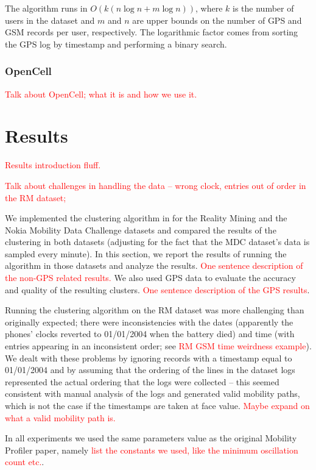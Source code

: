 \documentclass[letterpaper, 11pt, conference]{ieeeconf}
\newcommand{\xxx}[1]{\textcolor{red}{#1}}
\begin{document}
The algorithm runs in $O(k(n\log n + m\log n))$, where $k$ is the number of users in the dataset and $m$ and $n$ are upper bounds on the number of GPS and GSM records per user, respectively. The logarithmic factor comes from sorting the GPS log by timestamp and performing a binary search.

\subsubsection{OpenCell}

\xxx{Talk about OpenCell; what it is and how we use it.}

\section{Results}
\label{sec:results}
\xxx{Results introduction fluff.}

\xxx{Talk about challenges in handling the data -- wrong clock, entries out of order in the RM dataset;}

We implemented the clustering algorithm in \cite{mobilityprofiler} for the Reality Mining and the Nokia Mobility Data Challenge datasets and compared the results of the clustering in both datasets (adjusting for the fact that the MDC dataset's data is sampled every minute). In this section, we report the results of running the algorithm in those datasets and analyze the results. \xxx{One sentence description of the non-GPS related results.} We also used GPS data to evaluate the accuracy and quality of the resulting clusters. \xxx{One sentence description of the GPS results}.

Running the clustering algorithm on the RM dataset was more challenging than originally expected; there were inconsistencies with the dates (apparently the phones' clocks reverted to 01/01/2004 when the battery died) and time (with entries appearing in an inconsistent order; see \xxx{RM GSM time weirdness example}). We dealt with these problems by ignoring records with a timestamp equal to 01/01/2004 and by assuming that the ordering of the lines in the dataset logs represented the actual ordering that the logs were collected -- this seemed consistent with manual analysis of the logs and generated valid mobility paths, which is not the case if the timestamps are taken at face value. \xxx{Maybe expand on what a valid mobility path is.}

In all experiments we used the same parameters value as the original Mobility Profiler paper, namely \xxx{list the constants we used, like the minimum oscillation count etc.}.
\end{document}
